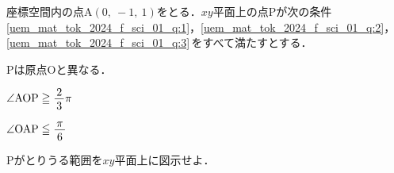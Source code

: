 ﻿\documentclass[../../../uem_mat_tok_q.tex]{subfiles}
\begin{document}
    座標空間内の点$\mathrm{A}(0,\:-1,\:1)$をとる．$xy$平面上の点Pが次の条件%
    \,\ref{uem_mat_tok_2024_f_sci_01_q:1}，\ref{uem_mat_tok_2024_f_sci_01_q:2}，%
    \ref{uem_mat_tok_2024_f_sci_01_q:3}\,をすべて満たすとする．

    \begin{myenua}
            \item Pは原点Oと異なる． \label{uem_mat_tok_2024_f_sci_01_q:1}
            \item $\angle\mathrm{AOP}\geqq\myfraca{2}{3}\pi$%
                \label{uem_mat_tok_2024_f_sci_01_q:2}
            \item $\angle\mathrm{OAP}\leqq\myfraca{\pi}{6}$%
                \label{uem_mat_tok_2024_f_sci_01_q:3}
    \end{myenua}
    Pがとりうる範囲を$xy$平面上に図示せよ．
\end{document}
